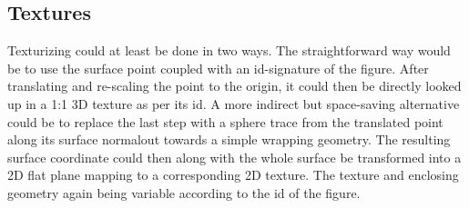 			\subsection{Textures}
		
				Texturizing could at least be done in two ways. The
				straightforward way would be to use the surface point coupled
				with an id-signature of the figure. After translating and
				re-scaling the point to the origin, it could then be directly
				looked up in a 1:1 3D texture as per its id. A more indirect
				but space-saving alternative could be to replace the last step
				with a sphere trace from the translated point along its surface
				normal\footnotemark out towards a simple wrapping geometry. The
				resulting surface coordinate could then along with the whole
				surface be transformed into a 2D flat plane mapping to a
				corresponding 2D texture. The texture and enclosing geometry
				again being variable according to the id of the figure.
		
		
